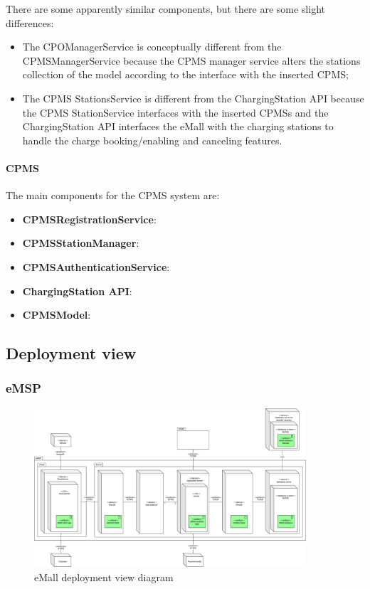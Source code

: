 There are some apparently similar components, but there are some slight differences:
\begin{itemize}
    \item The \ac{CPO}ManagerService is conceptually different from the \ac{CPMS}ManagerService because the CPMS manager service alters the stations collection of the model according to the interface with the inserted \ac{CPMS};
    \item The \ac{CPMS} StationsService is different from the ChargingStation \ac{API} because the \ac{CPMS} StationService interfaces with the inserted \acp{CPMS} and the ChargingStation \ac{API} interfaces the \ac{eMall} with the charging stations to handle the charge booking/enabling and canceling features.
\end{itemize}
\paragraph{\textbf{\ac{CPMS}}}
The main components for the \ac{CPMS} system are:
\begin{itemize}
    \item \textbf{\ac{CPMS}RegistrationService}:
    \item \textbf{\ac{CPMS}StationManager}:
    \item \textbf{\ac{CPMS}AuthenticationService}:
    \item \textbf{ChargingStation \ac{API}}:
    \item \textbf{\ac{CPMS}Model}:
\end{itemize}

\subsection{Deployment view}
\subsubsection{\ac{eMSP}}
\begin{figure}[!h]
    \begin{center}
        \includegraphics[keepaspectratio, width=0.9\textwidth]{Graphics/DD-eMSP-deployment.drawio.png}
        \caption{eMall deployment view diagram}
        \label{fig:eMSP-deployment}
    \end{center}
\end{figure}


